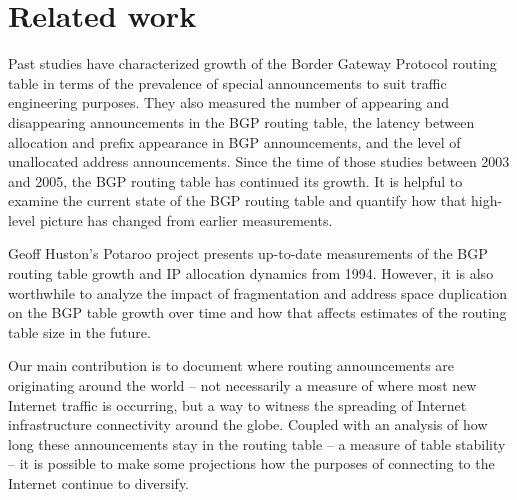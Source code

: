 \section{Related work}
\label{sec:related_work}

Past studies \cite{Meng:2005:IPv4-address} \cite{Xu:2003:IPv4-Address}
\cite{Meng:2003:An-analysis-of-BGP-routing} have characterized growth of the
Border Gateway Protocol routing table in terms of the prevalence of special
announcements to suit traffic engineering purposes. They also measured the
number of appearing and disappearing announcements in the BGP routing table,
the latency between allocation and prefix appearance in BGP announcements, and
the level of unallocated address announcements. Since the time of those
studies between 2003 and 2005, the BGP routing table has continued its growth.
It is helpful to examine the current state of the BGP routing table and
quantify how that high-level picture has changed from earlier measurements.

Geoff Huston's Potaroo project \cite{::IPv4-Address-Report} presents
up-to-date measurements of the BGP routing table growth and IP allocation
dynamics from 1994. However, it is also worthwhile to analyze the impact of
fragmentation and address space duplication on the BGP table growth over time
and how that affects estimates of the routing table size in the future.

Our main contribution is to document where routing announcements are
originating around the world -- not necessarily a measure of where most new
Internet traffic is occurring, but a way to witness the spreading of Internet
infrastructure connectivity around the globe. Coupled with an analysis of how
long these announcements stay in the routing table -- a measure of table
stability -- it is possible to make some projections how the purposes of
connecting to the Internet continue to diversify.

